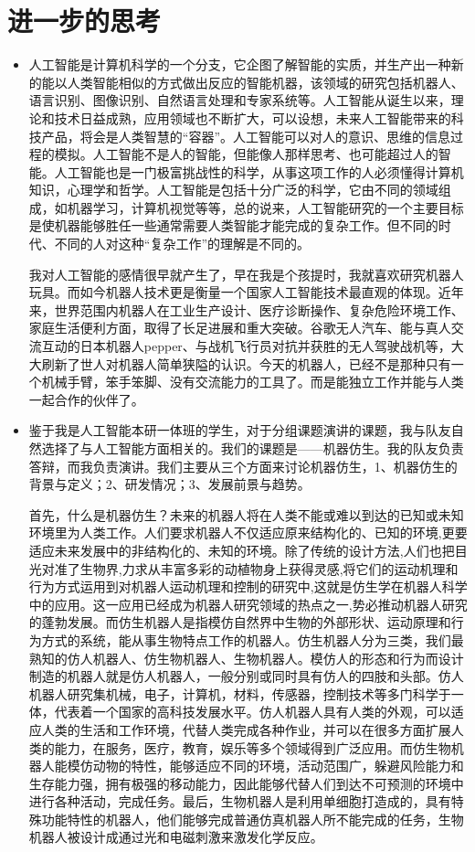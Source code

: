 \documentclass{article}
\begin{document}
\section{进一步的思考}
\begin{itemize}
	\item 人工智能是计算机科学的一个分支\cite{he2}，它企图了解智能的实质，并生产出一种新的能以人类智能相似的方式做出反应的智能机器，该领域的研究包括机器人、语言识别、图像识别、自然语言处理和专家系统等。人工智能从诞生以来，理论和技术日益成熟，应用领域也不断扩大，可以设想，未来人工智能带来的科技产品，将会是人类智慧的“容器”。人工智能可以对人的意识、思维的信息过程的模拟。人工智能不是人的智能，但能像人那样思考、也可能超过人的智能。人工智能也是一门极富挑战性的科学，从事这项工作的人必须懂得计算机知识，心理学和哲学。人工智能是包括十分广泛的科学，\cite{he3}它由不同的领域组成，如机器学习，计算机视觉等等，总的说来，人工智能研究的一个主要目标是使机器能够胜任一些通常需要人类智能才能完成的复杂工作。但不同的时代、不同的人对这种“复杂工作”的理解是不同的。\par 我对人工智能的感情很早就产生了，早在我是个孩提时，我就喜欢研究机器人玩具。而如今机器人技术更是衡量一个国家人工智能技术最直观的体现。近年来，世界范围内机器人在工业生产设计、医疗诊断操作、复杂危险环境工作、家庭生活便利方面，取得了长足进展和重大突破。谷歌无人汽车、能与真人交流互动的日本机器人pepper、与战机飞行员对抗并获胜的无人驾驶战机等，大大刷新了世人对机器人简单狭隘的认识。今天的机器人，已经不是那种只有一个机械手臂，笨手笨脚、没有交流能力的工具了。而是能独立工作并能与人类一起合作的伙伴了。 
	\item 鉴于我是人工智能本研一体班的学生，对于分组课题演讲的课题，我与队友自然选择了与人工智能方面相关的。我们的课题是——机器仿生。我的队友负责答辩，而我负责演讲。我们主要从三个方面来讨论机器仿生，1、机器仿生的背景与定义；2、研发情况；3、发展前景与趋势。\par 首先，什么是机器仿生？未来的机器人将在人类不能或难以到达的已知或未知环境里为人类工作。人们要求机器人不仅适应原来结构化的、已知的环境,更要适应未来发展中的非结构化的、未知的环境。除了传统的设计方法,人们也把目光对准了生物界,力求从丰富多彩的动植物身上获得灵感,将它们的运动机理和行为方式运用到对机器人运动机理和控制的研究中,这就是仿生学在机器人科学中的应用。这一应用已经成为机器人研究领域的热点之一,势必推动机器人研究的蓬勃发展。而仿生机器人是指模仿自然界中生物的外部形状、运动原理和行为方式的系统，能从事生物特点工作的机器人。仿生机器人分为三类，我们最熟知的仿人机器人、仿生物机器人、生物机器人。模仿人的形态和行为而设计制造的机器人就是仿人机器人，一般分别或同时具有仿人的四肢和头部。仿人机器人研究集机械，电子，计算机，材料，传感器，控制技术等多门科学于一体，代表着一个国家的高科技发展水平。仿人机器人具有人类的外观，可以适应人类的生活和工作环境，代替人类完成各种作业，并可以在很多方面扩展人类的能力，在服务，医疗，教育，娱乐等多个领域得到广泛应用。而仿生物机器人能模仿动物的特性，能够适应不同的环境，活动范围广，躲避风险能力和生存能力强，拥有极强的移动能力，因此能够代替人们到达不可预测的环境中进行各种活动，完成任务。最后，生物机器人是利用单细胞打造成的，具有特殊功能特性的机器人，他们能够完成普通仿真机器人所不能完成的任务，生物机器人被设计成通过光和电磁刺激来激发化学反应。

\end{itemize}
\end{document}
